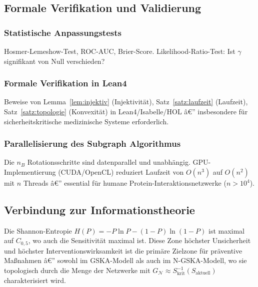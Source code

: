 ﻿\documentclass[12pt, a4paper]{article}
\theoremstyle{definition}
\theoremstyle{remark}
\newcommand{\calN}{\mathcal{N}}
\newcommand{\GN}{G_{\calN}}
\begin{document}
\subsection{Formale Verifikation und Validierung}

\subsubsection{Statistische Anpassungstests}

Hosmer-Lemeshow-Test, ROC-AUC, Brier-Score. Likelihood-Ratio-Test: Ist
$\gamma$ signifikant von Null verschieden?

\subsubsection{Formale Verifikation in Lean4}

Beweise von Lemma~\ref{lem:injektiv} (Injektivität), Satz~\ref{satz:laufzeit}
(Laufzeit), Satz~\ref{satz:topologie} (Konvexität) in Lean4/Isabelle/HOL â€”
insbesondere für sicherheitskritische medizinische Systeme erforderlich.

\subsubsection{Parallelisierung des Subgraph Algorithmus}

Die $n_B$ Rotationsschritte sind datenparallel und unabhängig. GPU-Implementierung
(CUDA/OpenCL) reduziert Laufzeit von $O(n^3)$ auf $O(n^2)$ mit $n$ Threads â€”
essential für humane Protein-Interaktionsnetzwerke ($n > 10^4$).

\subsection{Verbindung zur Informationstheorie}

Die Shannon-Entropie $H(P) = -P\ln P - (1-P)\ln(1-P)$ ist maximal auf $C_{0{,}5}$,
wo auch die Sensitivität maximal ist. Diese Zone höchster Unsicherheit und höchster
Interventionswirksamkeit ist die primäre Zielzone für präventive Maßnahmen â€”
sowohl im GSKA-Modell als auch im N-GSKA-Modell, wo sie topologisch durch die
Menge der Netzwerke mit $\GN \approx S^{-1}_{\mathrm{krit}}(S_{\mathrm{aktuell}})$
charakterisiert wird.
\end{document}
